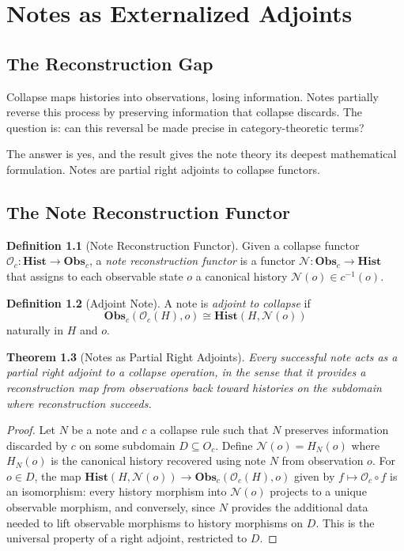\documentclass[12pt, a4paper, openany]{book}
\theoremstyle{plain}
\newtheorem{theorem}{Theorem}[chapter]
\theoremstyle{definition}
\newtheorem{definition}[theorem]{Definition}
\theoremstyle{remark}
\newcommand{\Hist}{\mathbf{Hist}}
\newcommand{\Obs}{\mathbf{Obs}}
\begin{document}
\chapter{Notes as Externalized Adjoints}

\section{The Reconstruction Gap}

Collapse maps histories into observations, losing information. Notes partially
reverse this process by preserving information that collapse discards. The
question is: can this reversal be made precise in category-theoretic terms?

The answer is yes, and the result gives the note theory its deepest mathematical
formulation. Notes are partial right adjoints to collapse functors.

\section{The Note Reconstruction Functor}

\begin{definition}[Note Reconstruction Functor]
Given a collapse functor $\mathcal{O}_c : \Hist \to \Obs_c$, a
\emph{note reconstruction functor} is a functor
$\mathcal{N} : \Obs_c \to \Hist$
that assigns to each observable state $o$ a canonical history
$\mathcal{N}(o) \in c^{-1}(o)$.
\end{definition}

\begin{definition}[Adjoint Note]
A note is \emph{adjoint to collapse} if
\[
\Obs_c(\mathcal{O}_c(H), o) \cong \Hist(H, \mathcal{N}(o))
\]
naturally in $H$ and $o$.
\end{definition}

\begin{theorem}[Notes as Partial Right Adjoints]
\label{thm:notes-adjoints}
Every successful note acts as a partial right adjoint to a collapse operation,
in the sense that it provides a reconstruction map from observations back toward
histories on the subdomain where reconstruction succeeds.
\end{theorem}

\begin{proof}
Let $N$ be a note and $c$ a collapse rule such that $N$ preserves information
discarded by $c$ on some subdomain $D \subseteq O_c$. Define
$\mathcal{N}(o) = H_N(o)$ where $H_N(o)$ is the canonical history recovered
using note $N$ from observation $o$. For $o \in D$, the map
$\Hist(H, \mathcal{N}(o)) \to \Obs_c(\mathcal{O}_c(H), o)$ given by
$f \mapsto \mathcal{O}_c \circ f$ is an isomorphism: every history morphism
into $\mathcal{N}(o)$ projects to a unique observable morphism, and conversely,
since $N$ provides the additional data needed to lift observable morphisms to
history morphisms on $D$. This is the universal property of a right adjoint,
restricted to $D$.
\end{proof}
\end{document}
